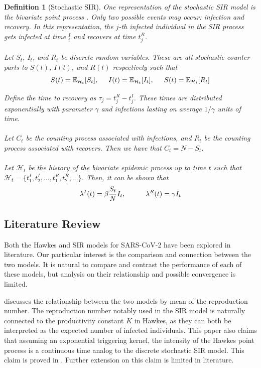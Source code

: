 \documentclass[12pt]{article}
\newtheorem{definition}{Definition}
\begin{document}
\begin{definition}[Stochastic SIR]
\label{stochastic-SIR}
One representation of the stochastic SIR model is the bivariate point process \cite{Rizoiu2018}. Only two possible events may occur: infection and recovery. In this representation, the $j$-th infected individual in the SIR process gets infected at time $_i^I$ and recovers at time $t_j^R$. 
\\
\\
Let $S_t$, $I_t$, and $R_t$ be discrete random variables. These are all stochastic counter parts to $S(t)$, $I(t)$, and $R(t)$ respectively such that
$$
S(t) = \mathbb{E}_{\mathcal{H}_t} [ S_t ] , \hspace{5mm}
I(t) = \mathbb{E}_{\mathcal{H}_t} [ I_t ] , \hspace{5mm}
S(t) = \mathbb{E}_{\mathcal{H}_t} [ R_t ] 
$$


Define the time to recovery as $\tau_j = t_j^R - t_j^I$. These times are distributed exponentially with parameter $\gamma$ and infections lasting on average $1/\gamma$ units of time. 
\\
\\
Let $C_t$ be the counting process associated with infections, and $R_t$ be the counting process associated with recovers. Then we have that $C_t = N - S_t$. 
\\
\\
Let $\mathcal{H}_t$ be the history of the bivariate epidemic process up to time $t$ such that $\mathcal{H}_t = \{t_1^I, t_2^I, \ldots, t_1^R, t_2^R, \ldots \}$. Then, it can be shown that
$$
\lambda^I(t) = \beta \frac{S_t}{N} I_t, \hspace{10mm}
\lambda^R(t) = \gamma I_t
$$  
\end{definition}









\subsection{Literature Review}

Both the Hawkes and SIR models for SARS-CoV-2 have been explored in literature. Our particular interest is the comparison and connection between the two models. It is natural to compare and contrast the performance of each of these models, but analysis on their relationship and possible convergence is limited. 

\cite{Kresin2022} discusses the relationship between the two models by mean of the reproduction number. The reproduction number notably used in the SIR model is naturally connected to the productivity constant $K$ in Hawkes, as they can both be interpreted as the expected number of infected individuals. This paper also claims that assuming an exponential triggering kernel, the intensity of the Hawkes point process is a continuous time analog to the discrete stochastic SIR model. This claim is proved in \cite{Rizoiu2018}. Further extension on this claim is limited in literature. 
\end{document}
